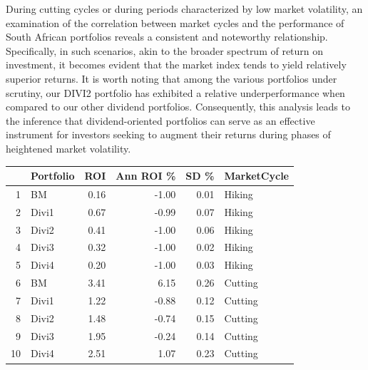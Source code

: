 \documentclass[11pt,preprint, authoryear]{elsarticle}
\let\origtable\table
\let\endorigtable\endtable
\renewenvironment{table}[1][2] {
    \expandafter\origtable\expandafter[H]
} {
    \endorigtable
}
\numberwithin{equation}{section}
\numberwithin{figure}{section}
\numberwithin{table}{section}
\begin{document}
During cutting cycles or during periods characterized by low market
volatility, an examination of the correlation between market cycles and
the performance of South African portfolios reveals a consistent and
noteworthy relationship. Specifically, in such scenarios, akin to the
broader spectrum of return on investment, it becomes evident that the
market index tends to yield relatively superior returns. It is worth
noting that among the various portfolios under scrutiny, our DIVI2
portfolio has exhibited a relative underperformance when compared to our
other dividend portfolios. Consequently, this analysis leads to the
inference that dividend-oriented portfolios can serve as an effective
instrument for investors seeking to augment their returns during phases
of heightened market volatility.

\begin{table}[H]
\centering
\begin{tabular}{rlrrrl}
  \hline
 & Portfolio & ROI & Ann ROI \% & SD \% & MarketCycle \\ 
  \hline
1 & BM & 0.16 & -1.00 & 0.01 & Hiking \\ 
  2 & Divi1 & 0.67 & -0.99 & 0.07 & Hiking \\ 
  3 & Divi2 & 0.41 & -1.00 & 0.06 & Hiking \\ 
  4 & Divi3 & 0.32 & -1.00 & 0.02 & Hiking \\ 
  5 & Divi4 & 0.20 & -1.00 & 0.03 & Hiking \\ 
  6 & BM & 3.41 & 6.15 & 0.26 & Cutting \\ 
  7 & Divi1 & 1.22 & -0.88 & 0.12 & Cutting \\ 
  8 & Divi2 & 1.48 & -0.74 & 0.15 & Cutting \\ 
  9 & Divi3 & 1.95 & -0.24 & 0.14 & Cutting \\ 
  10 & Divi4 & 2.51 & 1.07 & 0.23 & Cutting \\ 
   \hline
\end{tabular}
\caption{Interest Rate Regime Performance \label{tab7}} 
\end{table}
\end{document}
